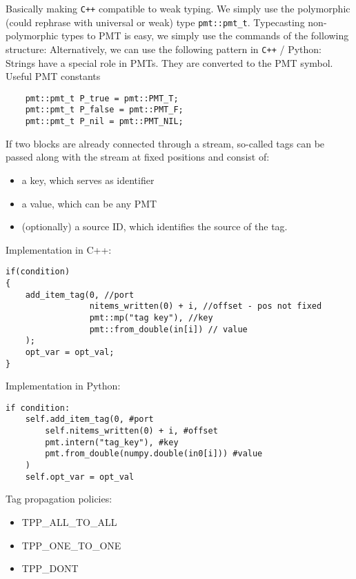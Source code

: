 \documentclass{article}
\begin{document}
\begin{description}[leftmargin=!, labelwidth=1in]
	\item[PMTs]  Basically making \texttt{C++} compatible to weak typing. We simply use the polymorphic (could rephrase with universal or weak) type \texttt{pmt::pmt\_t}. Typecasting non-polymorphic types to PMT is easy, we simply use the commands of the following structure:
	Alternatively, we can use the following pattern in \texttt{C++} / Python:
	Strings have a special role in PMTs. They are converted to the PMT symbol.
	Useful PMT constants
	\begin{verbatim}
	pmt::pmt_t P_true = pmt::PMT_T;
	pmt::pmt_t P_false = pmt::PMT_F;
	pmt::pmt_t P_nil = pmt::PMT_NIL;
	\end{verbatim}
	\item[Stream Tags] If two blocks are already connected through a stream, so-called tags can be passed along with the stream at fixed positions and consist of:
	\begin{itemize}
		\item a key, which serves as identifier
		\item a value, which can be any PMT
		\item (optionally) a source ID, which identifies the source of the tag.
	\end{itemize}
	Implementation in C++:
	\begin{verbatim}
if(condition)
{
	add_item_tag(0, //port
				 nitems_written(0) + i, //offset - pos not fixed
				 pmt::mp("tag key"), //key
				 pmt::from_double(in[i]) // value
	);
	opt_var = opt_val;
}
	\end{verbatim}
	Implementation in Python:
	\begin{verbatim}
if condition:
	self.add_item_tag(0, #port
		self.nitems_written(0) + i, #offset
		pmt.intern("tag_key"), #key
		pmt.from_double(numpy.double(in0[i])) #value
	)
	self.opt_var = opt_val
	\end{verbatim}
	Tag propagation policies:
	\begin{itemize}
		\item TPP\_ALL\_TO\_ALL
		\item TPP\_ONE\_TO\_ONE
		\item TPP\_DONT
	\end{itemize}
	

\end{description}
\end{document}
